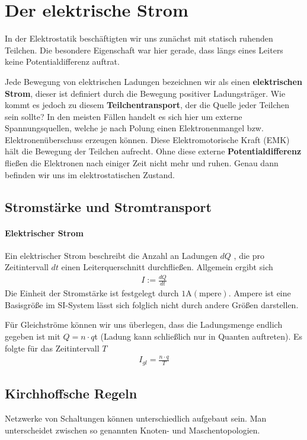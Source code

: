 \section{Der elektrische Strom}
In der Elektrostatik beschäftigten wir uns zunächst mit statisch ruhenden Teilchen. Die besondere Eigenschaft war hier gerade, dass längs eines Leiters keine Potentialdifferenz auftrat.
\par Jede Bewegung von elektrischen Ladungen bezeichnen wir als einen \textbf{elektrischen Strom}, dieser ist definiert durch die Bewegung positiver Ladungsträger.
Wie kommt es jedoch zu diesem \textbf{Teilchentransport}, der die Quelle jeder Teilchen sein sollte? In den meisten Fällen handelt es sich hier um externe Spannungsquellen, welche je nach Polung einen Elektronenmangel bzw. Elektronenüberschuss erzeugen können.
Diese Elektromotorische Kraft (EMK) hält die Bewegung der Teilchen aufrecht. Ohne diese externe \textbf{Potentialdifferenz }fließen die Elektronen nach einiger Zeit nicht mehr und ruhen. Genau dann befinden wir uns im elektrostatischen Zustand.

\subsection{Stromstärke und Stromtransport}

\paragraph{Elektrischer Strom}
Ein elektrischer Strom beschreibt die Anzahl an Ladungen $dQ$ , die pro Zeitintervall $dt$ einen Leiterquerschnitt durchfließen. Allgemein ergibt sich
\begin{align} \label{def:Strom}
\boxed{I := \frac{dQ}{dt}}
\end{align}
Die Einheit der Stromstärke ist festgelegt durch $1\mathrm{A(mpere)}$. Ampere ist eine Basisgröße im SI-System lässt sich folglich nicht durch andere Größen darstellen. 

Für Gleichströme können wir uns überlegen, dass die Ladungsmenge endlich gegeben ist
 mit $Q = n\cdot q$t (Ladung kann schließlich nur in Quanten auftreten). Es folgte für das Zeitintervall $T$ 
 \begin{align} \label{eqn:elektrischer Strom Gleichspannung}
I_{gl} = \frac{n\cdot q}{T}
\end{align}

\subsection{Kirchhoffsche Regeln}
Netzwerke von Schaltungen können unterschiedlich aufgebaut sein. Man unterscheidet zwischen so genannten Knoten- und Maschentopologien. 
